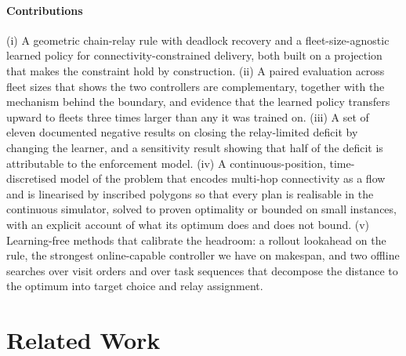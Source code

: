 \documentclass[final,5p,times,twocolumn]{elsarticle}
\begin{document}
\paragraph{Contributions}
(i) A geometric chain-relay rule with deadlock recovery and a fleet-size-agnostic learned
policy for connectivity-constrained delivery, both built on a projection that makes the
constraint hold by construction. (ii) A paired evaluation across fleet sizes that shows the two
controllers are complementary, together with the mechanism behind the boundary, and evidence that
the learned policy transfers upward to fleets three times larger than any it was trained on.
(iii) A set of eleven documented negative results on closing the relay-limited deficit by changing
the learner, and a sensitivity result showing that half of the deficit is attributable to the
enforcement model. (iv) A continuous-position, time-discretised model of the problem that encodes
multi-hop connectivity as a flow and is linearised by inscribed polygons so that every plan is
realisable in the continuous simulator, solved to proven optimality or bounded on small instances,
with an explicit account of what its optimum does and does not bound. (v) Learning-free methods
that calibrate the headroom: a rollout lookahead on the rule, the strongest online-capable
controller we have on makespan, and two offline searches over visit orders and over task
sequences that decompose the distance to the optimum into target choice and relay assignment.

\section{Related Work}
\label{sec:related}
\end{document}
